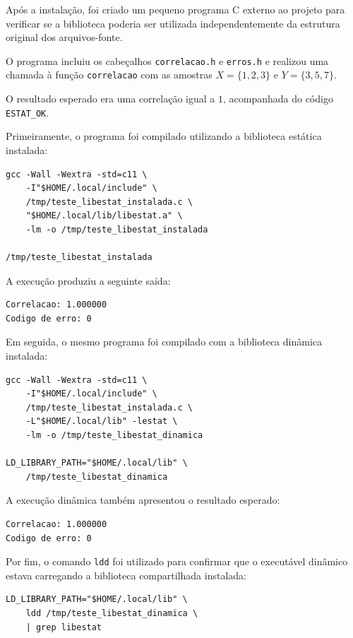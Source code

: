 \documentclass[12pt,a4paper]{article}
\newcommand{\cod}[1]{\texttt{#1}}
\begin{document}
Após a instalação, foi criado um pequeno programa
C externo ao projeto para verificar se a biblioteca
poderia ser utilizada independentemente da estrutura
original dos arquivos-fonte.

O programa incluiu os cabeçalhos
\cod{correlacao.h} e \cod{erros.h} e realizou
uma chamada à função \cod{correlacao} com as amostras
$X=\{1,2,3\}$ e $Y=\{3,5,7\}$.

O resultado esperado era uma correlação igual a
$1$, acompanhada do código \cod{ESTAT\_OK}.

Primeiramente, o programa foi compilado utilizando
a biblioteca estática instalada:

\begin{lstlisting}[style=shell]
gcc -Wall -Wextra -std=c11 \
    -I"$HOME/.local/include" \
    /tmp/teste_libestat_instalada.c \
    "$HOME/.local/lib/libestat.a" \
    -lm -o /tmp/teste_libestat_instalada

/tmp/teste_libestat_instalada
\end{lstlisting}

A execução produziu a seguinte saída:

\begin{lstlisting}
Correlacao: 1.000000
Codigo de erro: 0
\end{lstlisting}

Em seguida, o mesmo programa foi compilado com
a biblioteca dinâmica instalada:

\begin{lstlisting}[style=shell]
gcc -Wall -Wextra -std=c11 \
    -I"$HOME/.local/include" \
    /tmp/teste_libestat_instalada.c \
    -L"$HOME/.local/lib" -lestat \
    -lm -o /tmp/teste_libestat_dinamica

LD_LIBRARY_PATH="$HOME/.local/lib" \
    /tmp/teste_libestat_dinamica
\end{lstlisting}

A execução dinâmica também apresentou o resultado
esperado:

\begin{lstlisting}
Correlacao: 1.000000
Codigo de erro: 0
\end{lstlisting}

Por fim, o comando \cod{ldd} foi utilizado para
confirmar que o executável dinâmico estava carregando
a biblioteca compartilhada instalada:

\begin{lstlisting}[style=shell]
LD_LIBRARY_PATH="$HOME/.local/lib" \
    ldd /tmp/teste_libestat_dinamica \
    | grep libestat
\end{lstlisting}
\end{document}
